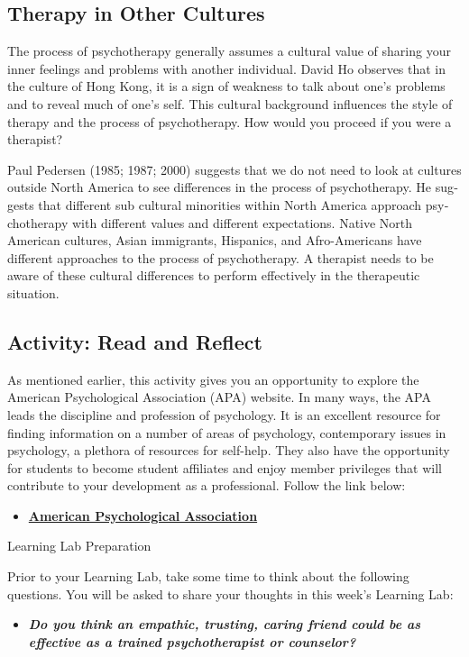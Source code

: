 \documentclass[
]{book}
\providecommand{\tightlist}{%
  \setlength{\itemsep}{0pt}\setlength{\parskip}{0pt}}
\begin{document}
\hypertarget{therapy-in-other-cultures-1}{%
\subsection*{Therapy in Other Cultures}\label{therapy-in-other-cultures-1}}

The process of psychotherapy generally assumes a cultural value of sharing your inner feelings and problems with another individual. David Ho observes that in the culture of Hong Kong, it is a sign of weakness to talk about one's problems and to reveal much of one's self. This cultural background influences the style of therapy and the process of psychotherapy. How would you proceed if you were a therapist?

Paul Pedersen (1985; 1987; 2000) suggests that we do not need to look at cultures outside North America to see differences in the process of psychotherapy. He sug­gests that different sub cultural minorities within North America approach psy­chotherapy with different values and different expectations. Native North American cultures, Asian immigrants, Hispanics, and Afro-Americans have different approaches to the pro­cess of psychotherapy. A therapist needs to be aware of these cultural differ­ences to perform effectively in the therapeutic situation.

\hypertarget{activity-read-and-reflect-23}{%
\subsection*{Activity: Read and Reflect}\label{activity-read-and-reflect-23}}

\begin{reflect}
As mentioned earlier, this activity gives you an opportunity to explore the American Psychological Association (APA) website. In many ways, the APA leads the discipline and profession of psychology. It is an excellent resource for finding information on a number of areas of psychology, contemporary issues in psychology, a plethora of resources for self-help. They also have the opportunity for students to become student affiliates and enjoy member privileges that will contribute to your development as a professional. Follow the link below:

\begin{itemize}
\tightlist
\item
  \href{https://www.apa.org/}{\textbf{American Psychological Association}}
\end{itemize}

{Learning Lab Preparation}

Prior to your Learning Lab, take some time to think about the following questions. You will be asked to share your thoughts in this week's Learning Lab:

\begin{itemize}
\tightlist
\item
  \textbf{\emph{Do you think an empathic, trusting, caring friend could be as effective as a trained psychotherapist or counselor?}}
\end{itemize}
\end{reflect}
\end{document}

